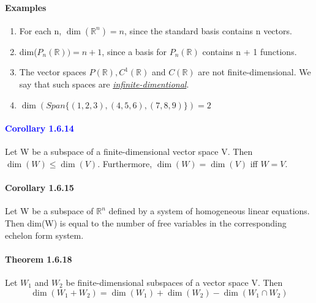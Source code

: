 \documentclass[11pt]{article}
\newcommand{\mb}[1]{\mathbb{#1}}
\newcommand{\under}[1]{\underline{#1}}
\begin{document}
	\paragraph{Examples}
	\begin{enumerate}
		\item For each n, $\dim(\mb{R}^n) = n$, since the standard basis contains n vectors.
		\item dim($P_n(\mb{R})) = n + 1$, since a basis for $P_n(\mb{R})$ contains n + 1 functions.
		\item The vector spaces $P(\mb{R}), C^1(\mb{R})$ and $C(\mb{R})$ are not finite-dimensional. We say that such spaces are \under{\it{infinite-dimentional}}.
		\item $\dim(Span\{(1,2,3),(4,5,6),(7,8,9)\}) = 2$
	\end{enumerate}
	\paragraph{\textcolor{blue}{Corollary 1.6.14}} Let W be a subspace of a finite-dimensional vector space V. Then $\dim(W) \leq \dim(V).$ Furthermore, $	\dim(W) = \dim(V)$ iff $W = V$.
	
	\paragraph{Corollary 1.6.15} Let W be a subspace of $\mb{R}^n$ defined by a system of homogeneous linear equations. Then dim(W) is equal to the number of free variables in the corresponding echelon form system.
	\paragraph{Theorem 1.6.18} Let $W_1$ and $W_2$ be finite-dimensional subspaces of a vector space V. Then $$\dim(W_1 + W_2) = \dim(W_1) + \dim(W_2) - \dim(W_1 \cap W_2)$$
\end{document}
